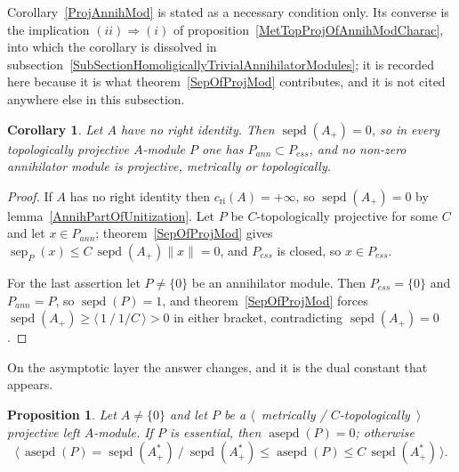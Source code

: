 \documentclass[11pt]{article}
\theoremstyle{plain}
\newtheorem{corollary}[theorem]{Corollary}
\newtheorem{proposition}[theorem]{Proposition}
\theoremstyle{definition}
\DeclareMathOperator{\sep}{sep}
\DeclareMathOperator{\sepd}{sepd}
\DeclareMathOperator{\asepd}{asepd}
\newcommand{\cri}{c_{\mathrm{ri}}}
\begin{document}
Corollary~\ref{ProjAnnihMod} is stated as a necessary condition only. Its
converse is the implication $(ii)\Rightarrow(i)$ of
proposition~\ref{MetTopProjOfAnnihModCharac}, into which the corollary is
dissolved in subsection~\ref{SubSectionHomoligicallyTrivialAnnihilatorModules};
it is recorded here because it is what
theorem~\ref{SepOfProjMod} contributes, and it is not cited anywhere else in
this subsection.

\begin{corollary}\label{ProjOverNonUnital}
Let $A$ have no right identity. Then $\sepd(A_+)=0$, so in every topologically
projective $A$-module $P$ one has $P_{ann}\subset P_{ess}$, and no non-zero
annihilator module is projective, metrically or topologically.
\end{corollary}

\begin{proof}
If $A$ has no right identity then $\cri(A)=+\infty$, so $\sepd(A_+)=0$ by
lemma~\ref{AnnihPartOfUnitization}. Let $P$ be $C$-topologically projective for
some $C$ and let $x\in P_{ann}$; theorem~\ref{SepOfProjMod} gives
$\sep_P(x)\leq C\,\sepd(A_+)\lVert x\rVert=0$, and $P_{ess}$ is closed, so
$x\in P_{ess}$.

For the last assertion let $P\neq \{0 \}$ be an annihilator module. Then
$P_{ess}= \{0 \}$ and $P_{ann}=P$, so $\sepd(P)=1$, and
theorem~\ref{SepOfProjMod} forces
$\sepd(A_+)\geq\langle\,1\ /\ 1/C\,\rangle>0$ in either bracket, contradicting
$\sepd(A_+)=0$.
\end{proof}

On the asymptotic layer the answer changes, and it is the dual constant that
appears.

\begin{proposition}\label{AsympSepOfProjMod}
Let $A\neq \{0 \}$ and let $P$ be a
$\langle$~metrically / $C$-topologically~$\rangle$ projective left $A$-module. If
$P$ is essential, then $\asepd(P)=0$; otherwise
\[
\langle\,\asepd(P)=\sepd(A_+^*)\ /\
\sepd(A_+^*)\leq\asepd(P)\leq C\,\sepd(A_+^*)\,\rangle .
\]
\end{proposition}
\end{document}
